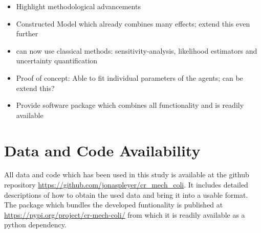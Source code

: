 \documentclass{article}
\begin{document}
\begin{itemize}
    \item Highlight methodological advancements
    \item Constructed Model which already combines many effects; extend this even further
    \item can now use classical methods: sensitivity-analysis, likelihood estimators and uncertainty quantification
    \item Proof of concept: Able to fit individual parameters of the agents; can be extend this?
    \item Provide software package which combines all functionality and is readily available
\end{itemize}

% 

\section{Data and Code Availability}
All data and code which has been used in this study is available at the github repository
\url{https://github.com/jonaspleyer/cr\_mech\_coli}.
It includes detailed descriptions of how to obtain the used data and bring it into a usable format.
The package which bundles the developed funtionality is published at
\url{https://pypi.org/project/cr-mech-coli/} from which it is readily available as a python
dependency.




\appendix
\renewcommand{\thesection}{}
\renewcommand{\thesubsection}{S\arabic{subsection}}
\end{document}
